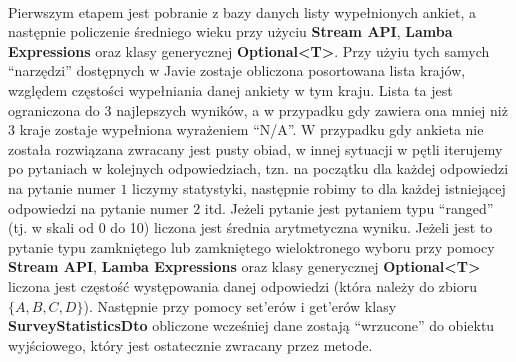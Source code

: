 \paragraph{}
Pierwszym etapem jest pobranie z bazy danych listy wypełnionych ankiet, a następnie policzenie średniego wieku przy użyciu \textbf{Stream API}, \textbf{Lamba Expressions} oraz klasy generycznej \textbf{Optional<T>}. Przy użyiu tych samych ``narzędzi'' dostępnych w Javie zostaje obliczona posortowana lista krajów, względem częstości wypełniania danej ankiety w tym kraju. Lista ta jest ograniczona do $3$ najlepszych wyników, a w przypadku gdy zawiera ona mniej niż $3$ kraje zostaje wypełniona wyrażeniem ``N/A''. W przypadku gdy ankieta nie została rozwiązana zwracany jest pusty obiad, w innej sytuacji w pętli iterujemy po pytaniach w kolejnych odpowiedziach, tzn. na początku dla każdej odpowiedzi na pytanie numer $1$ liczymy statystyki, następnie robimy to dla każdej istniejącej odpowiedzi na pytanie numer $2$ itd. Jeżeli pytanie jest pytaniem typu ``ranged'' (tj. w skali od 0 do 10) liczona jest średnia arytmetyczna wyniku. Jeżeli jest to pytanie typu zamkniętego lub zamkniętego wieloktronego wyboru przy pomocy \textbf{Stream API}, \textbf{Lamba Expressions} oraz klasy generycznej \textbf{Optional<T>} liczona jest częstość występowania danej odpowiedzi (która należy do zbioru $\{A,B,C,D\}$). Następnie przy pomocy set'erów i get'erów klasy \textbf{SurveyStatisticsDto} obliczone wcześniej dane zostają ``wrzucone'' do obiektu wyjściowego, który jest ostatecznie zwracany przez metode.
